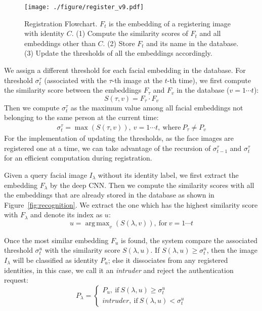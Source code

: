 \documentclass[10pt,twocolumn]{article}
\DeclareMathOperator*{\argmax}{arg\,max}
\begin{document}
\begin{figure}[t]
\centering
\texttt{[image: ./figure/register\_v9.pdf]}
\caption{Registration Flowchart. $F_{t}$ is the embedding of a registering image with identity $C$. (1) Compute the similarity scores of $F_{t}$ and all embeddings other than $C$. (2) Store $F_{t}$ and its name in the database. (3) Update the thresholds of all the embeddings accordingly.}
\label{fig:register}
\end{figure}

We assign a different threshold for each facial embedding in the database. For threshold $\sigma_{t}^{\tau}$ (associated with the $\tau$-th image at the $t$-th time), we first compute the similarity score between the embeddings $F_{\tau}$ and $F_{v}$ in the database ($v=1\cdots t$):
\begin{equation}
    S(\tau, v) = F_{\tau} \cdot F_{v}
\end{equation}
Then we compute $\sigma_t^\tau$ as the maximum value among all facial embeddings not belonging to the same person at the current time:
\begin{equation}
\begin{aligned}
    \sigma_{t}^{\tau} = \max(S(\tau, v))
    ,~v=1 \cdots t
    ,~\mathrm{where}~P_{\tau} \neq P_{v}
\end{aligned}
\end{equation}
For the implementation of updating the thresholds, as the face images are registered one at a time, we can take advantage of the recursion of $\sigma_{t-1}^{\tau}$ and $\sigma_{t}^{\tau}$ for an efficient computation during registration.









Given a query facial image $I_{\lambda}$ without its identity label, we first extract the embedding $F_{\lambda}$ by the deep CNN. Then we compute the similarity scores with all the embeddings that are already stored in the database as shown in Figure~\ref{fig:recognition}. We extract the one which has the highest similarity score with $F_{\lambda}$ and denote its index as $u$:
\begin{equation}
u = \argmax_{v} (S(\lambda, v)),~
\mathrm{for}~v=1 \cdots t
\end{equation}

Once the most similar embedding $F_{u}$ is found, the system compare the associated threshold $\sigma_{t}^{u}$ with the similarity score $S(\lambda, u)$. If $S(\lambda, u) \geq \sigma_{t}^{u}$, then the image $I_{\lambda}$ will be classified as identity $P_{u}$; else it dissociates from any registered identities, in this case, we call it an \textit{intruder} and reject the authentication request:
\begin{equation}
    P_{\lambda}=
    \begin{cases}
    P_{u},~\mathrm{if} \: 
    S(\lambda, u) \geq \sigma_{t}^{u}
    \\
    {intruder},~\mathrm{if} \: 
    S(\lambda, u) < \sigma_{t}^{u}
    \end{cases}
\end{equation}
\end{document}
